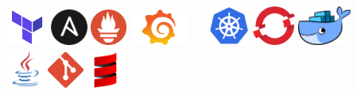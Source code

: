 \documentclass[]{friggeri-cv}
\begin{document}
\begin{bottom}
\qquad \qquad \qquad \qquad %
\includegraphics[height=12mm]{logo/terraform-logo.png} \qquad \qquad \qquad  %
\includegraphics[height=12mm]{logo/ansible-logo.png} \qquad \qquad \qquad %
\includegraphics[height=12mm]{logo/prometheus-logo.png} \qquad \qquad  %
\includegraphics[height=12mm]{logo/grafana-logo.png} \qquad \qquad  %
~
~
\qquad \qquad \qquad \qquad \qquad \qquad \qquad %
\includegraphics[height=13mm]{logo/kubernetes-logo.png}  \qquad \qquad  %
\includegraphics[height=13mm]{logo/openshift-logo.png}    \qquad \qquad  %
\includegraphics[height=13mm]{logo/docker-logo.png}  \qquad \qquad  %
~
~
\qquad \qquad \qquad \qquad %
\includegraphics[height=13mm]{logo/java-logo.png} \qquad  \qquad  %
\includegraphics[height=12mm]{logo/git-logo.png} \qquad\qquad  \qquad %
\includegraphics[height=12mm]{logo/scala-logo.png} \qquad \qquad %

\end{bottom}
\end{document}
